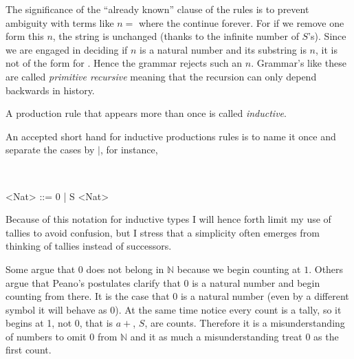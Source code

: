 The significance of the ``already known'' clause of the rules is to prevent ambiguity 
with terms like $n=$ where the  continue forever.
For if we remove one  form this $n$, the string is unchanged (thanks to 
the infinite number of $S$'s).  Since we are engaged in deciding if $n$ is a natural number and its substring 
is $n$, it is not of the form  for .  Hence the grammar 
rejects such an $n$.  Grammar's like these are called \emph{primitive recursive}
meaning that the recursion can only depend backwards 
in history.

\begin{definition}
    A production rule that appears more than once is called \emph{inductive}.
\end{definition}

An accepted short hand for inductive productions rules is to name it once 
and separate the cases by $\mid$, for instance,
\begin{center}
 \\
\begin{Gcode}[]
<Nat> ::= 0 
        | S <Nat>
\end{Gcode}
\end{center}
Because of this notation for inductive types I will hence forth limit my use of tallies
to avoid confusion, but I stress that a simplicity often emerges from thinking 
of tallies instead of successors.
    

\begin{remark}
    Some argue that $0$ does not belong in $\mathbb{N}$ because 
    we begin counting at $1$.  Others argue that Peano's postulates
    clarify that $0$ is a natural number and begin counting from there.
    It is the case that $0$ is a natural number (even by a different symbol 
    it will behave as $0$).  At the same time notice every count is 
    a tally, so it begins at 1, not 0, that is $a+$, $S$,  are
    counts.  Therefore it is a misunderstanding of numbers to omit $0$ 
    from $\mathbb{N}$ and it as much a misunderstanding treat $0$ as the first count.
\end{remark}

